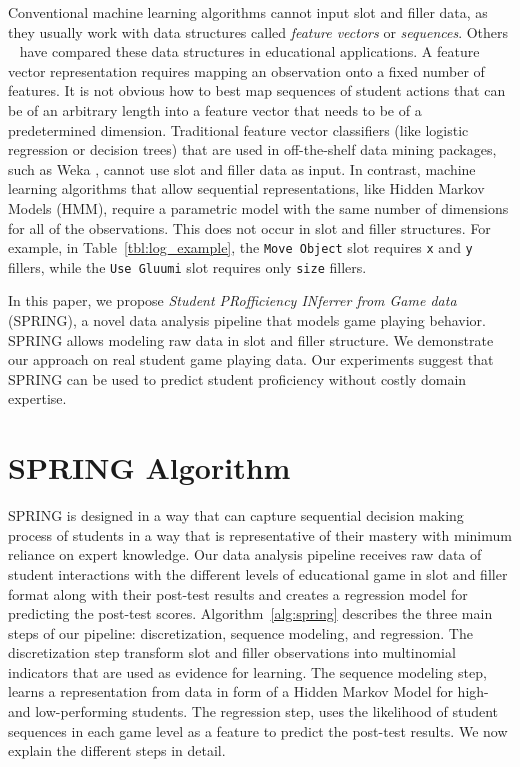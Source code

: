 \documentclass{sigchi}
\def\algname{SPRING\xspace}
\begin{document}
Conventional machine learning algorithms cannot input slot and filler data, as they  usually work with data structures called \textit{feature vectors} or \textit{sequences}.
Others ~\cite{sequences} have compared these data structures in educational applications.
A feature vector representation requires mapping an observation onto a fixed number of features.
It is not obvious how to best map sequences of student actions that can be of an arbitrary length into a feature vector that needs to be of a predetermined dimension.
Traditional feature vector classifiers (like logistic regression or decision trees)  that are used in off-the-shelf data mining packages, such as Weka \cite{hall2009weka}, cannot  use slot and filler data as input. 
In contrast, machine learning algorithms that allow sequential representations, like Hidden Markov Models (HMM), require a parametric model with the same number of dimensions for all of the observations.
This does not occur in slot and filler structures.
For example,  in Table~\ref{tbl:log_example}, the \texttt{Move Object} slot requires \texttt{x} and \texttt{y} fillers, while the \texttt{Use Gluumi} slot requires only \texttt{size} fillers.

In this paper, we propose \textit{Student PRofficiency INferrer from Game data} (SPRING), a novel data analysis pipeline that models game playing behavior.
\algname allows modeling raw data in slot and filler structure.
We demonstrate our approach on real student game playing data.
Our experiments suggest that \algname can be used to predict student proficiency  without costly domain expertise.

\section{SPRING Algorithm}


\algname is designed in a way that can capture sequential decision making process of students in a way that is representative of their mastery with minimum reliance on expert knowledge. Our data analysis pipeline receives raw data of student interactions with the different levels of educational game in slot and filler format along with their post-test results and creates a regression model for predicting the post-test scores. 
Algorithm~\ref{alg:spring} describes the three main steps of our pipeline: discretization,  sequence modeling, and regression.
The discretization step transform slot and filler observations into multinomial indicators that are used as evidence for learning.
The sequence modeling step, learns a representation from data in form of a Hidden Markov Model for high- and low-performing students.
The regression step, uses the likelihood of student sequences in each game level as a feature to predict the post-test results.
We now explain the different steps in detail.
\end{document}
